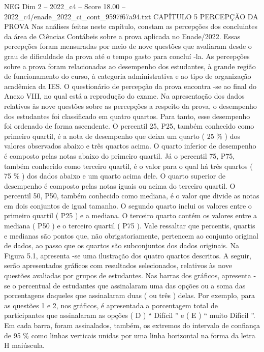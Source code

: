 \begin{textsample}{NEG Dim 2 – 2022\_c4 – Score 18.00 – 2022\_c4/enade\_2022\_ci\_cont\_9597f67a94.txt}  \label{ex:f2_neg_406}
CAPÍTULO 5 PERCEPÇÃO DA PROVA Nas análises feitas neste capítulo, constam as percepções dos concluintes da área de Ciências Contábeis sobre a prova aplicada no Enade/2022.
Essas percepções foram mensuradas por meio de nove questões que avaliaram desde o grau de dificuldade da prova até o tempo gasto para concluí -la.
As percepções sobre a prova foram relacionadas ao desempenho dos estudantes, à grande região de funcionamento do curso, à categoria administrativa e ao tipo de organização acadêmica da IES.
O questionário de percepção da prova encontra -se ao final do Anexo VIII, no qual está a reprodução do exame.
Na apresentação dos dados relativos às nove questões sobre as percepções a respeito da prova, o desempenho dos estudantes foi classificado em quatro quartos.
Para tanto, esse desempenho foi ordenado de forma ascendente.
O percentil 25, P25, também conhecido como primeiro quartil, é a nota de desempenho que deixa um quarto ( 25 \% ) dos valores observados abaixo e três quartos acima.
O quarto inferior de desempenho é composto pelas notas abaixo do primeiro quartil.
Já o percentil 75, P75, também conhecido como terceiro quartil, é o valor para o qual há três quartos ( 75 \% ) dos dados abaixo e um quarto acima dele.
O quarto superior de desempenho é composto pelas notas iguais ou acima do terceiro quartil.
O percentil 50, P50, também conhecido como mediana, é o valor que divide as notas em dois conjuntos de igual tamanho.
O segundo quarto inclui os valores entre o primeiro quartil ( P25 ) e a mediana.
O terceiro quarto contém os valores entre a mediana ( P50 ) e o terceiro quartil ( P75 ).
Vale ressaltar que percentis, quartis e medianas são pontos que, não obrigatoriamente, pertencem ao conjunto original de dados, ao passo que os quartos são subconjuntos dos dados originais.
Na Figura 5.1, apresenta -se uma ilustração dos quatro quartos descritos.
A seguir, serão apresentados gráficos com resultados selecionados, relativos às nove questões avaliadas por grupos de estudantes.
Nas barras dos gráficos, apresenta -se o percentual de estudantes que assinalaram uma das opções ou a soma das porcentagens daqueles que assinalaram duas ( ou três ) delas.
Por exemplo, para as questões 1 e 2, nos gráficos, é apresentada a porcentagem total de participantes que assinalaram as opções ( D ) “ Difícil ” e ( E ) “ muito Difícil ”.
Em cada barra, foram assinalados, também, os extremos do intervalo de confiança de 95 \% como linhas verticais unidas por uma linha horizontal na forma da letra H maiúscula.

\end{textsample}
